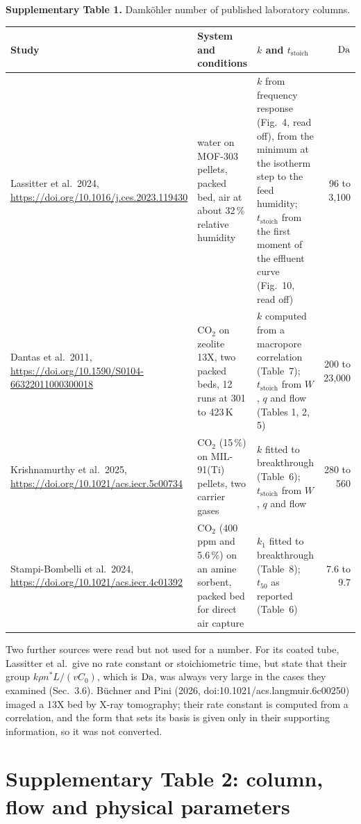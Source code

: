 \begin{table}[htbp]
\centering
\small
\textbf{Supplementary Table 1.} Damk\"ohler number of published laboratory columns.
\par\medskip
\begin{tabularx}{\textwidth}{@{}>{\raggedright\arraybackslash}p{3.3cm}>{\raggedright\arraybackslash}X>{\raggedright\arraybackslash}X r@{}}
\toprule
Study & System and conditions & $k$ and $t_{\mathrm{stoich}}$ & $\mathrm{Da}$ \\
\midrule
Lassitter et al.\ 2024, \url{https://doi.org/10.1016/j.ces.2023.119430} & water on MOF-303 pellets, packed bed,
  air at about 32\,\% relative humidity & $k$ from frequency response (Fig.~4, read off), from the
  minimum at the isotherm step to the feed humidity; $t_{\mathrm{stoich}}$ from the first moment of
  the effluent curve (Fig.~10, read off) & 96 to 3,100 \\
Dantas et al.\ 2011, \url{https://doi.org/10.1590/S0104-66322011000300018} & CO$_2$ on zeolite 13X, two packed
  beds, 12 runs at 301 to 423\,K & $k$ computed from a macropore correlation (Table~7);
  $t_{\mathrm{stoich}}$ from $W$, $q$ and flow (Tables 1, 2, 5) & 200 to 23{,}000 \\
Krishnamurthy et al.\ 2025, \url{https://doi.org/10.1021/acs.iecr.5c00734} & CO$_2$ (15\,\%) on MIL-91(Ti) pellets,
  two carrier gases & $k$ fitted to breakthrough (Table~6); $t_{\mathrm{stoich}}$ from $W$, $q$ and
  flow & 280 to 560 \\
Stampi-Bombelli et al.\ 2024, \url{https://doi.org/10.1021/acs.iecr.4c01392} & CO$_2$ (400\,ppm and 5.6\,\%) on an
  amine sorbent, packed bed for direct air capture & $k_1$ fitted to breakthrough (Table~8);
  $t_{50}$ as reported (Table~6) & 7.6 to 9.7 \\
\bottomrule
\end{tabularx}
\end{table}

Two further sources were read but not used for a number. For its coated tube,
Lassitter et al.\ give no rate constant or stoichiometric time, but state that their group
$k\rho n^{*}L/(vC_0)$, which is $\mathrm{Da}$, was always very large in the cases they examined
(Sec.~3.6). Büchner and Pini (2026, doi:10.1021/acs.langmuir.6c00250) imaged a 13X bed by X-ray
tomography; their rate constant is computed from a correlation, and the form that sets its basis is
given only in their supporting information, so it was not converted.

\section*{Supplementary Table 2: column, flow and physical parameters}

